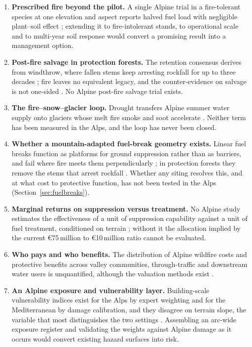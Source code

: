 \documentclass[11pt,a4paper]{article}
\begin{document}
\begin{enumerate}
    \item \textbf{Prescribed fire beyond the pilot.} A single Alpine trial in a fire-tolerant species at one elevation and aspect reports halved fuel load with negligible plant--soil effect \citep{gamba_prescribed_2025}; extending it to fire-intolerant stands, to operational scale and to multi-year soil response would convert a promising result into a management option.
    \item \textbf{Post-fire salvage in protection forests.} The retention consensus derives from windthrow, where fallen stems keep arresting rockfall for up to three decades \citep{costa_biological_2021}; fire leaves no equivalent legacy, and the counter-evidence on salvage is not one-sided \citep{seben_impact_2024}. No Alpine post-fire salvage trial exists.
    \item \textbf{The fire--snow--glacier loop.} Drought transfers Alpine summer water supply onto glaciers \citep{leone_20222023_2026} whose melt fire smoke and soot accelerate \citep{aubrywake_fire_2022, koshkin_wildfire_2022}. Neither term has been measured in the Alps, and the loop has never been closed.
    \item \textbf{Whether a mountain-adapted fuel-break geometry exists.} Linear fuel breaks function as platforms for ground suppression rather than as barriers, and fail where fire meets them perpendicularly \citep{ortega_modeling_2024}; in protection forests they remove the stems that arrest rockfall \citep{costa_biological_2021, moos_climate_2021}. Whether any siting resolves this, and at what cost to protective function, has not been tested in the Alps (Section~\ref{sec:fuelbreaks}).
    \item \textbf{Marginal returns on suppression versus treatment.} No Alpine study estimates the effectiveness of a unit of suppression capability against a unit of fuel treatment, conditioned on terrain \citep{cardil_assessing_2025, brodie_forest_2024}; without it the allocation implied by the current €75\,million to €10\,million ratio \citep{muller_forest_2020} cannot be evaluated.
    \item \textbf{Who pays and who benefits.} The distribution of Alpine wildfire costs and protective benefits across valley communities, through-traffic and downstream water users is unquantified, although the valuation methods exist \citep{accastello_asforesee_2019, moos_climate_2021}.
    \item \textbf{An Alpine exposure and vulnerability layer.} Building-scale vulnerability indices exist for the Alps by expert weighting and for the Mediterranean by damage calibration, and they disagree on terrain slope, the variable that most distinguishes the two settings \citep{papathomakohle_towards_2025, papathomakohle_wildfire_2022}. Assembling an arc-wide exposure register and validating the weights against Alpine damage as it occurs would convert existing hazard surfaces into risk.

\end{enumerate}
\end{document}
